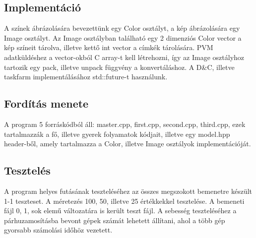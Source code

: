 \documentclass[12pt]{article}
\begin{document}
\subsection{Implementáció}

A színek ábrázolására bevezettünk egy Color osztályt, a kép ábrázolására egy Image osztályt. Az Image osztályban található egy 2 dimenziós Color vector a kép színeit tárolva, illetve kettő int vector a címkék tárolására. PVM adatküldéshez a vector-okból C array-t kell létrehozni, így az Image osztályhoz tartozik egy pack, illetve unpack függvény a konvertáláshoz. A D\&C, illetve taskfarm implementálásához std::future-t használunk.

\subsection{Fordítás menete}

A program 5 forráskódból áll: master.cpp, first.cpp, second.cpp, third.cpp, ezek tartalmazzák a fő, illetve gyerek folyamatok kódjait, illetve egy model.hpp header-ből, amely tartalmazza a Color, illetve Image osztályok implementációját.

\subsection{Tesztelés}

A program helyes futásának teszteléséhez az összes megszokott bemenetre készült 1-1 teszteset. A méretezés 100, 50, illetve 25 értékkekkel tesztelése. A bemeneti fájl 0, 1, sok elemű változatára is került teszt fájl. A sebesség teszteléséhez a párhuzamosításba bevont gépek számát lehetett állítani, ahol a több gép gyorsabb számolási időhöz vezetett.
\end{document}
